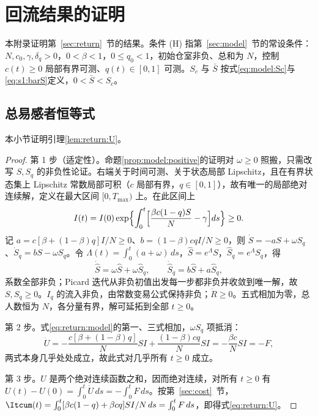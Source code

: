 \section{回流结果的证明}
\label{sec:proof:return}
本附录证明第~\ref{sec:return}~节的结果。条件 (H) 指第~\ref{sec:model}~节的常设条件：$N,c_0,\gamma,\delta_q>0$，$0<\beta<1$，$0\le q_0<1$，初始仓室非负、总和为 $N$，控制 $c(t)\ge0$ 局部有界可测、$q(t)\in[0,1]$ 可测。$S_c$ 与 $\bar S$ 按式\eqref{eq:model:Sc}与\eqref{eq:s1:barS}定义，$0<\bar S<S_c$。

\subsection{总易感者恒等式}
\label{sec:proof:return:U}
本小节证明引理\ref{lem:return:U}。
\begin{proof}
第 1 步（适定性）。命题\ref{prop:model:positive}的证明对 $\omega\ge0$ 照搬，只需改写 $S,S_q$ 的非负性论证。右端关于时间可测、关于状态局部 Lipschitz，且在有界状态集上 Lipschitz 常数局部可积（$c$ 局部有界，$q\in[0,1]$），故有唯一的局部绝对连续解，定义在最大区间 $[0,T_{\max})$ 上。在此区间上
\[
I(t)=I(0)\exp\Bigl\{\int_0^t\Bigl[\frac{\beta c(1-q)S}{N}-\gamma\Bigr]ds\Bigr\}\ge0 .
\]
记 $a=c[\beta+(1-\beta)q]I/N\ge0$、$b=(1-\beta)cqI/N\ge0$，则 $\dot S=-aS+\omega S_q$、$\dot S_q=bS-\omega S_q$。令 $\Lambda(t)=\int_0^t(a+\omega)\,ds$，$\hat S=e^{\Lambda}S$，$\hat S_q=e^{\Lambda}S_q$，得
\[
\dot{\hat S}=\omega\hat S+\omega\hat S_q,\qquad
\dot{\hat S}_q=b\hat S+a\hat S_q ,
\]
系数全部非负；Picard 迭代从非负初值出发每一步都非负并收敛到唯一解，故 $S,S_q\ge0$。$I_q$ 的流入非负，由常数变易公式保持非负；$\dot R\ge0$。五式相加为零，总人数恒为 $N$，各分量有界，解可延拓到全部 $t\ge0$。

第 2 步。式\eqref{eq:return:model}的第一、三式相加，$\omega S_q$ 项抵消：
\[
\dot U=-\frac{c[\beta+(1-\beta)q]}{N}SI+\frac{(1-\beta)cq}{N}SI=-\frac{\beta c}{N}SI=-F,
\]
两式本身几乎处处成立，故此式对几乎所有 $t\ge0$ 成立。

第 3 步。$U$ 是两个绝对连续函数之和，因而绝对连续，对所有 $t\ge0$ 有 $U(t)-U(0)=\int_0^t\dot U\,ds=-\int_0^tF\,ds$。按第~\ref{sec:cost}~节，$\Itcum(t)=\int_0^t[\beta c(1-q)+\beta cq]SI/N\,ds=\int_0^tF\,ds$，即得式\eqref{eq:return:U}。
\end{proof}

